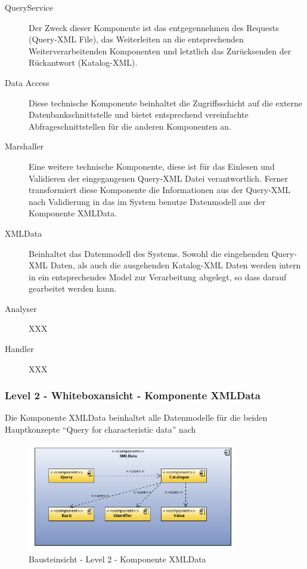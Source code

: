 \begin{description}
\item[QueryService] Der Zweck dieser Komponente ist das entgegennehmen des Requests (Query-XML File), das Weiterleiten an die entsprechenden Weiterverarbeitenden Komponenten und letztlich das Zurücksenden der Rückantwort (Katalog-XML).
\item[Data Access] Diese technische Komponente beinhaltet die Zugriffsschicht auf die externe Datenbankschnittstelle und bietet entsprechend vereinfachte Abfrageschnittstellen für die anderen Komponenten an. 
\item[Marshaller] Eine weitere technische Komponente, diese ist für das Einlesen und Validieren der eingegangenen Query-XML Datei verantwortlich. Ferner transformiert diese Komponente die Informationen aus der Query-XML nach Validierung in das im System benutze Datenmodell aus der Komponente XMLData.
\item[XMLData] Beinhaltet das Datenmodell des Systems. Sowohl die eingehenden Query-XML Daten, als auch die ausgehenden Katalog-XML Daten werden intern in ein entsprechendes Model zur Verarbeitung abgelegt, so dass darauf gearbeitet werden kann.  
\item[Analyser] XXX
\item[Handler] XXX
\end{description}

\subsubsection{Level 2 - Whiteboxansicht - Komponente XMLData} 

Die Komponente XMLData beinhaltet alle Datenmodelle für die beiden Hauptkonzepte \enquote{Query for characteristic data} nach 

\begin{figure}[htbp]
	\centering
		\includegraphics[width=0.82\textwidth]{images/bausteinsicht_plib_level2_xmldata.png}
	\caption{Bausteinsicht - Level 2 - Komponente XMLData}
	\label{fig:bausteinsicht_level2_xmldata}
\end{figure}

